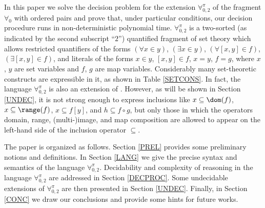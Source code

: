 \documentclass[submission,copyright,creativecommons]{eptcs}
\newcommand{\Lang}{\ensuremath{\mathbf{\forall}^{\pi}_{0,2}}\xspace}
\newcommand{\vx}{x}
\newcommand{\vy}{y}
\newcommand{\svx}{x}
\newcommand{\svy}{y}
\newcommand{\mvx}{f}
\newcommand{\mvy}{g}
\newcommand{\corr}[1]{#1}
\begin{document}
In this paper we solve the decision problem for the
extension \Lang of the fragment $\forall_{0}$ with ordered pairs
and prove that, under particular conditions, our decision procedure
runs in non-deterministic polynomial time.
\Lang is a two-sorted \corr{(as indicated by the second subscript ``$2$'')} quantified fragment of set theory which allows
restricted quantifiers of the forms $(\forall \svx \in \svy)$,
$(\exists \svx \in \svy)$, $(\forall [\svx, \svy] \in \mvx)$,
$(\exists [\svx, \svy] \in \mvx)$, and literals of the forms $\svx \in
\svy$, $[\svx, \svy] \in \mvx$, $\vx=\vy$, $\mvx = \mvy$, where
$\svx$, $\svy$ are set variables and $\mvx$, $\mvy$ are map variables.
Considerably many set-theoretic constructs are expressible in it, as
shown in Table \ref{SETCONS}.  In fact, the language \Lang is also an
extension of \mlsscart.  However, as will be shown in Section
\ref{UNDEC}, it is not strong enough to express inclusions like $\svx
\subseteq \dom(\mvx)$, $\svx \subseteq \range(\mvx)$, $\svx \subseteq
\mvx[\svy]$, and $h \subseteq f \circ g$, but only those in which the
operators domain, range, \corr{(multi-)}image, and map composition are allowed to
appear on the left-hand side of the inclusion operator $\subseteq$.






The paper is organized as follows.  Section \ref{PREL} provides some
preliminary notions and definitions.  In Section \ref{LANG} we give
the precise syntax and semantics of the language \Lang.  Decidability
and complexity of reasoning in the language \Lang are addressed
in Section \ref{DECPROC}.  Some undecidable extensions of \Lang are
then presented in Section \ref{UNDEC}.  Finally, in Section \ref{CONC}
we draw our conclusions and provide some hints for future works.
\end{document}

